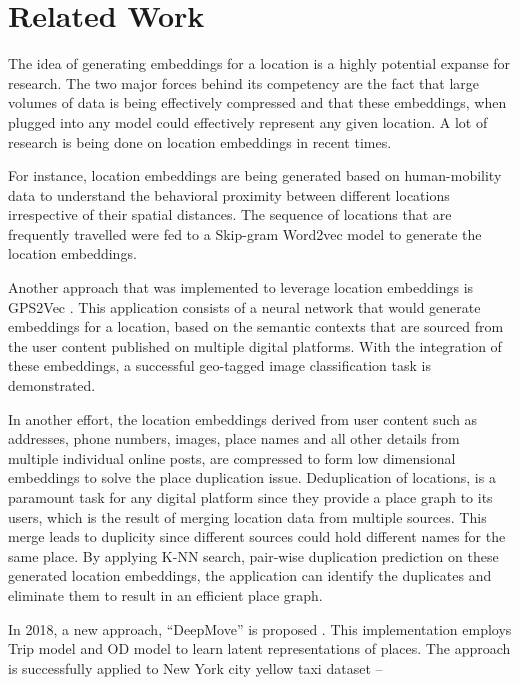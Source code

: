 \documentclass{article}
\begin{document}
\section{Related Work}
\par The idea of generating embeddings for a location is a highly potential expanse for
research. The two major forces behind its competency are the fact that large volumes of
data is being effectively compressed and that these embeddings, when plugged into any
model could effectively represent any given location.  A lot of research is being done 
on location embeddings in recent times. 
\par For instance, location embeddings are being 
generated based on human-mobility data \parencite{GeoEmbeddings} to understand the 
behavioral proximity between different locations irrespective of their spatial distances.
The sequence of locations that are frequently travelled were fed to a Skip-gram Word2vec 
model to generate the location embeddings. 
\par Another approach that was implemented to 
leverage location embeddings is GPS2Vec  \parencite{GPS2Vec}.  This application consists
of a neural network that would generate embeddings for a location, based on the semantic 
contexts that are sourced from the user content published on multiple digital platforms.
With the integration of these embeddings, a successful geo-tagged image classification 
task is demonstrated. 
\par In another effort\parencite{PlaceDeduplication}, the location embeddings derived from user content such as addresses, phone numbers, images, place
names and all other details from multiple individual online posts, are compressed to 
form low dimensional embeddings to solve the place duplication issue. Deduplication of 
locations, is a paramount task for any digital platform since they provide a place graph
to its users, which is the result of merging location data from multiple sources. This 
merge leads to duplicity since different sources could hold different names for the same 
place. By applying K-NN search, pair-wise duplication prediction on these generated 
location embeddings, the application can identify the duplicates and eliminate them to 
result in an efficient place graph.
\par In 2018, a new approach, “DeepMove” is proposed \parencite{DeepMove}. This 
implementation employs Trip model and OD model to learn latent representations of 
places.  The approach is successfully applied to New York city yellow taxi dataset – 
\end{document}
